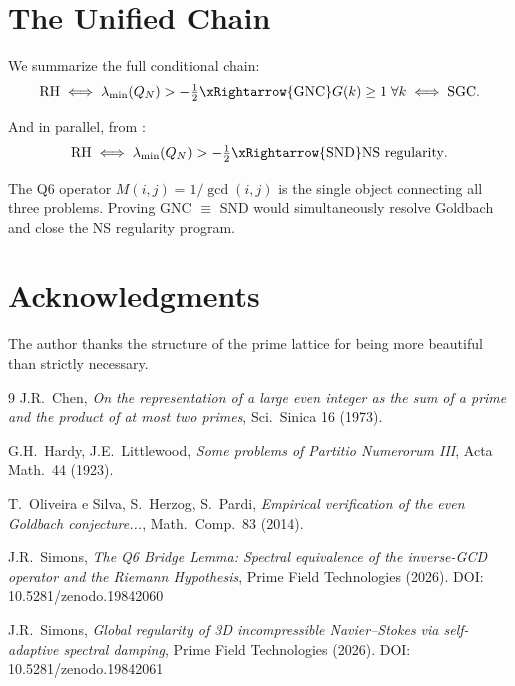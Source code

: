 \documentclass[11pt]{article}
\begin{document}
\section{The Unified Chain}

We summarize the full conditional chain:
\[
\text{RH} \iff \lambda_{\min}(Q_N) > -\tfrac{1}{2} 
\xRightarrow{\text{GNC}} G(k) \geq 1 \;\forall k 
\iff \text{SGC}.
\]

And in parallel, from \cite{simons2026ns}:
\[
\text{RH} \iff \lambda_{\min}(Q_N) > -\tfrac{1}{2}
\xRightarrow{\text{SND}} \text{NS regularity}.
\]

The Q6 operator $M(i,j) = 1/\gcd(i,j)$ is the single object 
connecting all three problems. Proving GNC $\equiv$ SND would 
simultaneously resolve Goldbach and close the NS regularity program.

\section*{Acknowledgments}
The author thanks the structure of the prime lattice for being more 
beautiful than strictly necessary.

\begin{thebibliography}{9}
 J.R.\ Chen, \emph{On the representation of a large even integer 
as the sum of a prime and the product of at most two primes}, Sci.\ Sinica 16 (1973).

 G.H.\ Hardy, J.E.\ Littlewood, \emph{Some problems of 
Partitio Numerorum III}, Acta Math.\ 44 (1923).

 T.\ Oliveira e Silva, S.\ Herzog, S.\ Pardi, 
\emph{Empirical verification of the even Goldbach conjecture...}, 
Math.\ Comp.\ 83 (2014).

 J.R.\ Simons, \emph{The Q6 Bridge Lemma: 
Spectral equivalence of the inverse-GCD operator and the Riemann Hypothesis},
Prime Field Technologies (2026). DOI: 10.5281/zenodo.19842060

 J.R.\ Simons, \emph{Global regularity of 3D 
incompressible Navier--Stokes via self-adaptive spectral damping},
Prime Field Technologies (2026). DOI: 10.5281/zenodo.19842061
\end{thebibliography}
\end{document}
